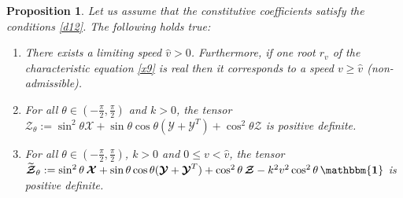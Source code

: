 \documentclass[10pt]{article}
\newcommand{\id}{{\mathbf{\mathbbm{1}}}}
\newtheorem{proposition}[theorem]{Proposition}
\begin{document}
 \begin{proposition}\label{lemmaGH} Let  {us} assume that  the constitutive coefficients satisfy the conditions 	\eqref{d12}. The following  {holds} true:
 	\begin{enumerate}
 \item	There	exists a limiting speed $\widehat{v}>0$. Furthermore,   if one root   $r_v$ of the characteristic equation \eqref{x9} is real then it corresponds to a speed $v\geq \widehat{v}$ (non-admissible).
 \item For all $\theta\in \left(-\frac{\pi}{2},\frac{\pi}{2}\right)$ and $k>0$, the tensor $\boldsymbol{\mathcal{Z}}_\theta:=\sin^2\theta\boldsymbol{\mathcal{X}}+\sin\theta\cos\theta (\boldsymbol{\mathcal{Y}}+\boldsymbol{\mathcal{Y}}^T)+\cos^2\theta\boldsymbol{\mathcal{Z}}$ is positive definite.
 \item For all $\theta\in \left(-\frac{\pi}{2},\frac{\pi}{2}\right)$, $k>0$ and $0\le v<\widehat{v}$, the tensor $\widetilde{\boldsymbol{\mathcal{Z}}}_\theta:=\sin^2\theta\,\boldsymbol{\mathcal{X}}+\sin\theta\cos\theta (\boldsymbol{\mathcal{Y}}+\boldsymbol{\mathcal{Y}}^T)+\cos^2\theta\,\boldsymbol{\mathcal{Z}}-k^2 v^2 \cos^2\theta \,{\id}$ is positive definite.
 \end{enumerate}
 \end{proposition}
\end{document}

